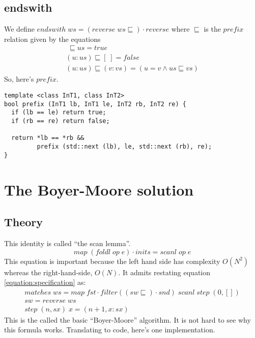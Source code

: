 \documentclass{article}
\begin{document}
\subsection{endswith}
We define \(endswith\;ws = (reverse\;ws\sqsubseteq)\cdot reverse\)
where \( \sqsubseteq \) is the \(prefix\) relation given by the
equations
\begin{gather*}
[\;]\;\sqsubseteq us = true \\
(u:us) \sqsubseteq [\;] = false \\
(u:us) \sqsubseteq (v:vs) = (u = v \land us \sqsubseteq vs)
\end{gather*}
So, here's \(prefix\).
\begin{verbatim}
template <class InT1, class InT2>
bool prefix (InT1 lb, InT1 le, InT2 rb, InT2 re) {
  if (lb == le) return true;
  if (rb == re) return false;

  return *lb == *rb && 
         prefix (std::next (lb), le, std::next (rb), re);
}
\end{verbatim}

\section{The Boyer-Moore solution}
\subsection{Theory}
This identity is called ``the scan lemma''.
\begin{equation}
map\;(foldl\;op\;e) \cdot inits = scanl\;op\;e
\end{equation}
This equation is important because the left hand side has complexity
\(O(N^{2})\) whereas the right-hand-side, \(O(N)\). It admits
restating equation \ref{equation:specification} as:
\begin{gather}\label{equation:matches}
matches\;ws = map\;fst \cdot filter ((sw \sqsubseteq) \cdot snd)\;scanl\; step\;(0, []) \nonumber\\
sw = reverse\;ws \nonumber\\
step\;(n, sx)\;x = (n + 1, x:sx)
\end{gather}
This is the called the basic ``Boyer-Moore'' algorithm. It is not hard
to see why this formula works. Translating to code, here's one
implementation.
\end{document}

